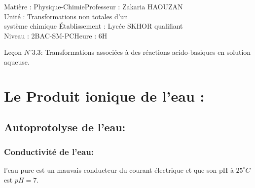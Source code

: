 \documentclass[12pt]{article}
\author{Zakaria HAOUZAN}
\date{\today}
\newcommand\headerMe[2]{\noindent{}#1\hfill#2}
\begin{document}
\headerMe{Matière : Physique-Chimie}{Professeur : Zakaria HAOUZAN}\\
\headerMe{Unité : Transformations non totales d'un\\système chimique  }{Établissement : Lycée SKHOR qualifiant}\\
\headerMe{Niveau : 2BAC-SM-PC}{Heure : 6H}\\







\begin{center}

    \Large{Leçon $N^{\circ} 3.3 $: \color{red} Transformations associées à des réactions acido-basiques en solution aqueuse. }
\end{center}

\section{Le Produit ionique de l'eau : }
\subsection{Autoprotolyse de l'eau: } 
\subsubsection{Conductivité de l'eau:} 

l'eau pure est un mauvais conducteur du courant électrique et que son pH à $25^{\circ}C$ est $pH=7$.
\end{document}
